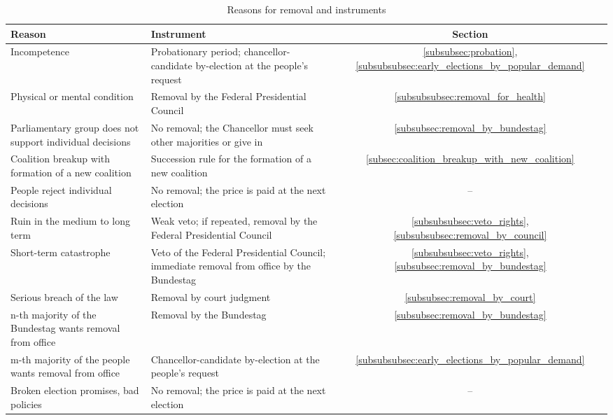 \begin{table}[H]
\renewcommand{\arraystretch}{1.4}%
\begin{tabularx}{\linewidth}{| >{\raggedright\arraybackslash}X | >{\raggedright\arraybackslash}X | c |}
  \hline
  \textbf{Reason} & \textbf{Instrument} & \textbf{Section} \\
  \hline
  Incompetence & Probationary period; chancellor-candidate by-election at the people's request & \ref{subsubsec:probation}, \ref{subsubsubsec:early_elections_by_popular_demand} \\
  \hline
  Physical or mental condition & Removal by the Federal Presidential Council & \ref{subsubsubsec:removal_for_health} \\
  \hline
  Parliamentary group does not support individual decisions & No removal; the Chancellor must seek other majorities or give in & \ref{subsubsec:removal_by_bundestag} \\
  \hline
  Coalition breakup with formation of a new coalition & Succession rule for the formation of a new coalition & \ref{subsec:coalition_breakup_with_new_coalition} \\
  \hline
  People reject individual decisions & No removal; the price is paid at the next election & -- \\
  \hline
  Ruin in the medium to long term & Weak veto; if repeated, removal by the Federal Presidential Council & \ref{subsubsubsec:veto_rights}, \ref{subsubsubsec:removal_by_council} \\
  \hline
  Short-term catastrophe & Veto of the Federal Presidential Council; immediate removal from office by the Bundestag & \ref{subsubsubsec:veto_rights}, \ref{subsubsec:removal_by_bundestag} \\
  \hline
  Serious breach of the law & Removal by court judgment & \ref{subsubsec:removal_by_court} \\
  \hline
  n-th majority of the Bundestag wants removal from office & Removal by the Bundestag & \ref{subsubsec:removal_by_bundestag} \\
  \hline
  m-th majority of the people wants removal from office & Chancellor-candidate by-election at the people's request & \ref{subsubsubsec:early_elections_by_popular_demand} \\
  \hline
  Broken election promises, bad policies & No removal; the price is paid at the next election & -- \\
  \hline
\end{tabularx}
\caption{Reasons for removal and instruments}
\label{tab:removal_grounds}
\end{table}

